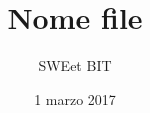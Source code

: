 



\title{\textbf{Nome file}}
\author{SWEet BIT}

\date{1 marzo 2017}




\makeFrontPage

\tableofcontents
\newpage
\listoffigures
\newpage
\listoftables





